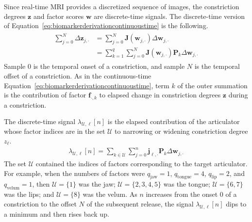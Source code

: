 \documentclass[preprint]{JASAnew}
\begin{document}
Since real-time MRI provides a discretized sequence of images, the constriction degrees $\mathbf{z}$ and factor scores $\mathbf{w}$ are discrete-time signals. 
%
The discrete-time version of Equation~\ref{eq:biomarkerderivationcontinuoustime} is the following.
%
\begin{align}
\begin{split}
\sum_{j=0}^{N} \Delta \mathbf{z}_{j,\cdot}
	&= \sum_{j=0}^{N} \mathbf{J}\left( \mathbf{w}_{j,\cdot} \right) \Delta \mathbf{w}_{j,\cdot} \\
    &= \sum_{k=1}^q \sum_{j=0}^{N} \mathbf{J}\left( \mathbf{w}_{j,\cdot} \right) \mathbf{P}_k \Delta \mathbf{w}_{j,\cdot}
\end{split}
\end{align}
%
Sample $0$ is the temporal onset of a constriction, and sample $N$ is the temporal offset of a constriction.
%
As in the continuous-time Equation~\ref{eq:biomarkerderivationcontinuoustime}, term $k$ of the outer summation is the contribution of factor $\mathbf{f}_{\cdot,k}$ to elapsed change in constriction degrees $\mathbf{z}$ during a constriction.



The discrete-time signal $\lambda_{\mathcal{U},\ell}[n]$ is the elapsed contribution of the articulator whose factor indices are in the set $\mathcal{U}$ to narrowing or widening constriction degree $z_\ell$. 
\begin{align}
\lambda_{\mathcal{U},\ell} \left[ n \right]
	= \sum_{k\in \mathcal{U}} \sum_{j=0}^{n} \mathbf{j}_{\ell,\cdot} \mathbf{P}_k \Delta \mathbf{w}_{j,\cdot}
\end{align}
The set $\mathcal{U}$ contained the indices of factors corresponding to the target articulator. For example, when the numbers of factors were $q_\text{jaw} = 1$, $q_\text{tongue} = 4$, $q_\text{lip} = 2$, and $q_\text{velum} = 1$, then  $\mathcal{U}=\{1\}$ was the jaw; $\mathcal{U}=\{2,3,4,5\}$ was the tongue; $\mathcal{U}=\{6,7\}$ was the lips; and $\mathcal{U}=\{8\}$ was the velum.
%
As $n$ increases from the onset $0$ of a constriction to the offset $N$ of the subsequent release, the signal $\lambda_{\mathcal{U},\ell}[n]$ dips to a minimum and then rises back up. 
\end{document}
